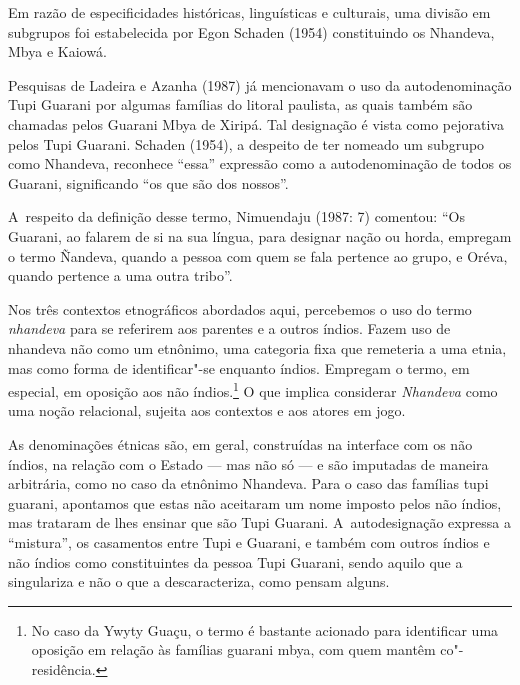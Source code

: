 Em razão de especificidades históricas, linguísticas e culturais, uma
divisão em subgrupos foi estabelecida por Egon Schaden (1954)
constituindo os Nhandeva, Mbya e Kaiowá.

Pesquisas de Ladeira e Azanha (1987) já mencionavam o uso da
autodenominação Tupi Guarani por algumas famílias do litoral paulista,
as quais também são chamadas pelos Guarani Mbya de Xiripá. Tal
designação é vista como pejorativa pelos Tupi Guarani. Schaden (1954),
a despeito de ter nomeado um subgrupo como Nhandeva, reconhece ``essa''
expressão como a autodenominação de todos os Guarani, significando ``os
que são dos nossos''.

A~respeito da definição desse termo, Nimuendaju (1987: 7) comentou: ``Os
Guarani, ao falarem de si na sua língua, para designar nação ou horda,
empregam o termo Ñandeva, quando a pessoa com quem se fala pertence ao
grupo, e Oréva, quando pertence a uma outra tribo''.

Nos três contextos etnográficos abordados aqui, percebemos o uso do
termo \emph{nhandeva} para se referirem aos parentes e a outros índios. Fazem
uso de nhandeva não como um etnônimo, uma categoria fixa que remeteria
a uma etnia, mas como forma de identificar"-se enquanto índios. Empregam
o termo, em especial, em oposição aos não índios.\footnote{No caso da
Ywyty Guaçu, o termo é bastante acionado para identificar uma oposição
em relação às famílias guarani mbya, com quem mantêm co"-residência.} O
que implica considerar \emph{Nhandeva} como uma noção relacional, sujeita aos
contextos e aos atores em jogo.

As denominações étnicas são, em geral, construídas na interface com os
não índios, na relação com o Estado --- mas não só --- e são imputadas de
maneira arbitrária, como no caso da etnônimo Nhandeva. Para o caso das
famílias tupi guarani, apontamos que estas não aceitaram um nome
imposto pelos não índios, mas trataram de lhes ensinar que são Tupi
Guarani. A~autodesignação expressa a ``mistura'', os casamentos entre Tupi
e Guarani, e também com outros índios e não índios como constituintes
da pessoa Tupi Guarani, sendo aquilo que a singulariza e não o que a
descaracteriza, como pensam alguns.

